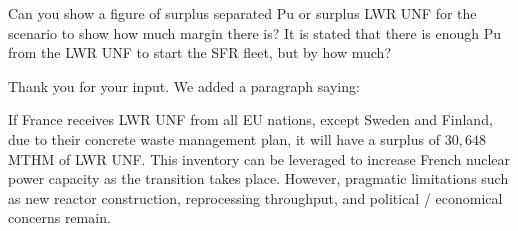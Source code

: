 \documentclass[answers,11pt]{exam}
\begin{document}
\begin{questions}
        \question Can you show a figure of surplus separated Pu or surplus LWR 
        UNF for the scenario to show how much margin there is? It is stated 
        that there is enough Pu from the LWR UNF to start the SFR fleet, but by 
        how much?
        \begin{solution}
	        	Thank you for your input.
                We added a paragraph saying:
                
                If France receives LWR UNF from all EU nations,
                except Sweden and Finland, due to their concrete waste management plan,
                it will have a surplus of $30,648$ MTHM of LWR UNF. This
                inventory can be leveraged to increase French nuclear power capacity as
                the transition takes place. However, pragmatic limitations such
                as new reactor construction, reprocessing throughput, and
                political / economical concerns remain. 
                
        \end{solution}



\end{questions}
%
%
\end{document}
